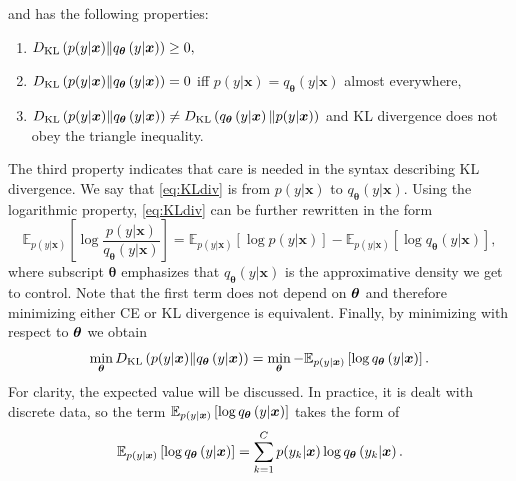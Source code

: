 and has the following properties:
\begin{enumerate}
\item $D_{\mathrm{KL}} \left(p(y| \boldsymbol{x}) \Vert q_{\boldsymbol{\theta}}\left(y|\boldsymbol{x}\right) \right) \geq 0,$
\item $D_{\mathrm{KL}} \left(p(y| \boldsymbol{x}) \Vert q_{\boldsymbol{\theta}}\left(y|\boldsymbol{x}\right) \right) = 0$ iff $p(y| \boldsymbol{x}) = q_{\boldsymbol{\theta}}\left(y|\boldsymbol{x}\right)$ almost everywhere,
\item $D_{\mathrm{KL}} \left(p(y| \boldsymbol{x}) \Vert q_{\boldsymbol{\theta}}\left(y|\boldsymbol{x}\right) \right) \neq D_{\mathrm{KL}} \left(q_{\boldsymbol{\theta}}\left(y|\boldsymbol{x}\right) \Vert p(y| \boldsymbol{x}) \right)$ and KL divergence does not obey the triangle inequality.
\end{enumerate}
The third property indicates that care is needed in the syntax describing KL divergence. We say that \eqref{eq:KLdiv} is from $p(y| \boldsymbol{x})$ to $q_{\boldsymbol{\theta}}\left(y|\boldsymbol{x}\right)$. Using the logarithmic property, \eqref{eq:KLdiv} can be further rewritten in the form 
\begin{equation}
	 \mathbb{E}_{p(y| \boldsymbol{x})} \left[\log\frac{p(y| \boldsymbol{x})}{q_{\boldsymbol{\theta}}\left(y|\boldsymbol{x}\right)} \right] = 
	 \mathbb{E}_{p(y| \boldsymbol{x})} \left[\log p(y| \boldsymbol{x}) \right] - \mathbb{E}_{p(y| \boldsymbol{x})} \left[\log q_{\boldsymbol{\theta}}\left(y|\boldsymbol{x}\right) \right],
	\end{equation}
where subscript $\boldsymbol{\theta}$ emphasizes that $q_{\boldsymbol{\theta}}\left(y|\boldsymbol{x}\right)$ is the approximative density we get to control. Note that
the first term does not depend on $\boldsymbol{\theta}$ and therefore minimizing either CE or KL divergence is equivalent. Finally, by minimizing with respect to $\boldsymbol{\theta}$ we obtain
\begin{equation}
\min_{\boldsymbol{\theta}} D_{\mathrm{KL}} \left(p(y| \boldsymbol{x}) \Vert q_{\boldsymbol{\theta}}\left(y|\boldsymbol{x}\right) \right) = \min_{\boldsymbol{\theta}} - \mathbb{E}_{p(y| \boldsymbol{x})}\left[ \log q_{\boldsymbol{\theta}}\left(y|\boldsymbol{x}\right)\right].
\end{equation}
For clarity, the expected value will be discussed. In practice, it is dealt with discrete data, so the term $\mathbb{E}_{ p(y| \boldsymbol{x})}\left[\log q_{\boldsymbol{\theta}}\left(y|\boldsymbol{x}\right)\right]$ takes the form of
\begin{equation}
    \mathbb{E}_{p(y| \boldsymbol{x})}\left[\log q_{\boldsymbol{\theta}}\left(y|\boldsymbol{x}\right)\right] = \sum_{k=1}^C p(y_k| \boldsymbol{x})\log q_{\boldsymbol{\theta}}\left(y_k|\boldsymbol{x}\right).
\end{equation}

